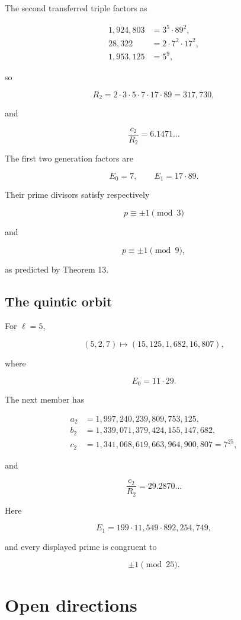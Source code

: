 \documentclass[11pt]{article}
\begin{document}
The second transferred triple factors as

\[
\begin{aligned}
1{,}924{,}803
&=
3^5\cdot89^2,\\
28{,}322
&=
2\cdot7^2\cdot17^2,\\
1{,}953{,}125
&=
5^9,
\end{aligned}
\]

so

\[
R_2
=
2\cdot3\cdot5\cdot7\cdot17\cdot89
=
317{,}730,
\]

and

\[
\frac{c_2}{R_2}
=
6.1471\ldots
\]

The first two generation factors are

\[
E_0=7,
\qquad
E_1=17\cdot89.
\]

Their prime divisors satisfy respectively

\[
p\equiv\pm1\pmod3
\]

and

\[
p\equiv\pm1\pmod9,
\]

as predicted by Theorem 13.

\subsection{The quintic orbit}

For \(\ell=5\),

\[
(5,2,7)
\longmapsto
(15{,}125,1{,}682,16{,}807),
\]

where

\[
E_0=11\cdot29.
\]

The next member has

\[
\begin{aligned}
a_2
&=
1{,}997{,}240{,}239{,}809{,}753{,}125,\\
b_2
&=
1{,}339{,}071{,}379{,}424{,}155{,}147{,}682,\\
c_2
&=
1{,}341{,}068{,}619{,}663{,}964{,}900{,}807
=
7^{25},
\end{aligned}
\]

and

\[
\frac{c_2}{R_2}
=
29.2870\ldots
\]

Here

\[
E_1
=
199\cdot11{,}549\cdot892{,}254{,}749,
\]

and every displayed prime is congruent to

\[
\pm1\pmod{25}.
\]

\section{Open directions}
\end{document}
